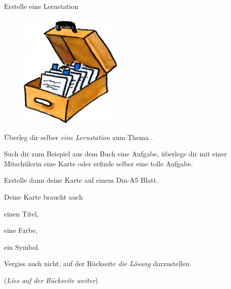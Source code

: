 \documentclass[12pt,a5paper,landscape]{scrartcl}
\begin{document}
	\begin{karte3}[\symPartner]{Erstelle eine Lernstation}
		\bigskip
			
		\begin{figure}
			\includegraphics[width=5cm]{6.2-LT-Abb_Kartei}
		\end{figure}
		Überleg dir selber \emph{eine Lernstation} zum Thema \emph{\Titel}.
		
		Such dir zum Beispiel aus dem Buch eine Aufgabe, überlege dir mit einer Mitschülerin eine Karte oder erfinde selber eine tolle Aufgabe.
		
		Erstelle dann deine Karte auf einem Din-A5 Blatt.
		
		Deine Karte braucht auch
		\begin{smallitemize}
			\item einen Titel,
			\item eine Farbe,
			\item ein Symbol.
		\end{smallitemize}
		
		Vergiss auch nicht, auf der Rückseite \emph{die Lösung} darzustellen.
		
		\bigskip
		(\textit{Lies auf der Rückseite weiter})

	\end{karte3}
	
\end{document}
